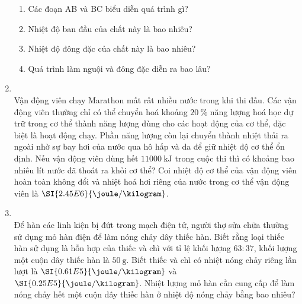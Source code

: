 \begin{enumerate}[label=\bfseries Câu \arabic*:, leftmargin=1.7cm]
\begin{center}
	\end{center}
\begin{enumerate}[label=\alph*)]
	\item Các đoạn AB và BC biểu diễn quá trình gì?
	\item Nhiệt độ ban đầu của chất này là bao nhiêu?
	\item Nhiệt độ đông đặc của chất này là bao nhiêu?
	\item Quá trình làm nguội và đông đặc diễn ra bao lâu?
\end{enumerate}
	\item {}\\
	Vận động viên chạy Marathon mất rất nhiều nước trong khi thi đấu. Các vận động viên thường chỉ có thể chuyển hoá khoảng $\SI{20}{\percent}$ năng lượng hoá học dự trữ trong cơ thể thành năng lượng dùng cho các hoạt động của cơ thể, đặc biệt là hoạt động chạy. Phần năng lượng còn lại chuyển thành nhiệt thải ra ngoài nhờ sự bay hơi của nước qua hô hấp và da để giữ nhiệt độ cơ thể ổn định. Nếu vận động viên dùng hết $\SI{11000}{\kilo\joule}$ trong cuộc thi thì có khoảng bao nhiêu lít nước đã thoát ra khỏi cơ thể? Coi nhiệt độ cơ thể của vận động viên hoàn toàn không đổi và nhiệt hoá hơi riêng của nước trong cơ thể vận động viên là $\SI{2.45E6}{\joule/\kilogram}$.

\item {}\\
Để hàn các linh kiện bị đứt trong mạch điện tử, người thợ sửa chữa thường sử dụng mỏ hàn điện để làm nóng chảy dây thiếc hàn. Biết rằng loại thiếc hàn sử dụng là hỗn hợp của thiếc và chì với tỉ lệ khối lượng $63:37$, khối lượng một cuộn dây thiếc hàn là $\SI{50}{\gram}$. Biết thiếc và chì có nhiệt nóng chảy riêng lần lượt là $\SI{0.61E5}{\joule/\kilogram}$ và $\SI{0.25E5}{\joule/\kilogram}$. Nhiệt lượng mỏ hàn cần cung cấp để làm nóng chảy hết một cuộn dây thiếc hàn ở nhiệt độ nóng chảy bằng bao nhiêu?


\end{enumerate}
